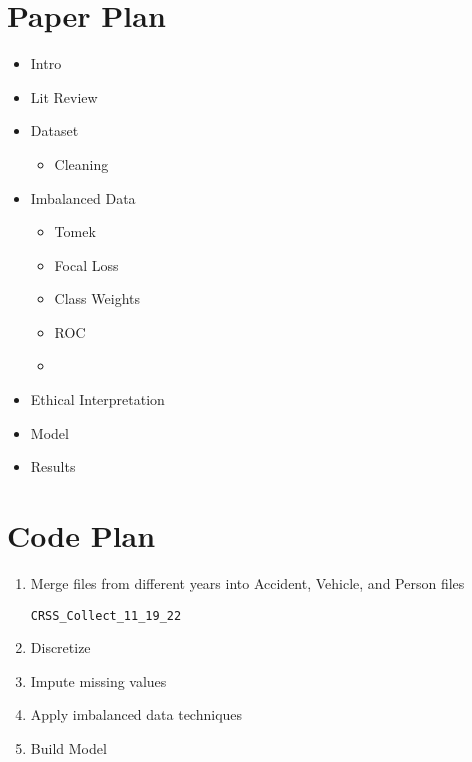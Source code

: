 \section{Paper Plan}

\begin{itemize}
	\item Intro
	\item Lit Review
	\item Dataset
	\begin{itemize}
		\item Cleaning
	\end{itemize}
	\item Imbalanced Data
	\begin{itemize}
		\item Tomek
		\item Focal Loss
		\item Class Weights
		\item ROC
		\item 
	\end{itemize}
	\item Ethical Interpretation
	\item Model
	\item Results
\end{itemize}

\section{Code Plan}

\begin{enumerate}
	\item Merge files from different years into Accident, Vehicle, and Person files
	
	\verb|CRSS_Collect_11_19_22|
	\item Discretize
	\item Impute missing values	
	\item Apply imbalanced data techniques
	\item Build Model
\end{enumerate}